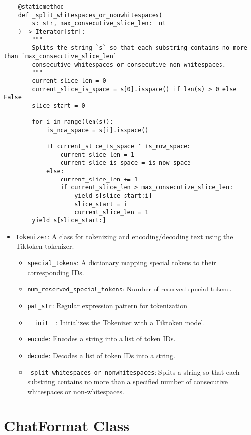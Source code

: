\begin{lstlisting}
    @staticmethod
    def _split_whitespaces_or_nonwhitespaces(
        s: str, max_consecutive_slice_len: int
    ) -> Iterator[str]:
        """
        Splits the string `s` so that each substring contains no more than `max_consecutive_slice_len`
        consecutive whitespaces or consecutive non-whitespaces.
        """
        current_slice_len = 0
        current_slice_is_space = s[0].isspace() if len(s) > 0 else False
        slice_start = 0

        for i in range(len(s)):
            is_now_space = s[i].isspace()

            if current_slice_is_space ^ is_now_space:
                current_slice_len = 1
                current_slice_is_space = is_now_space
            else:
                current_slice_len += 1
                if current_slice_len > max_consecutive_slice_len:
                    yield s[slice_start:i]
                    slice_start = i
                    current_slice_len = 1
        yield s[slice_start:]
\end{lstlisting}

\begin{itemize}
    \item \texttt{Tokenizer}: A class for tokenizing and encoding/decoding text using the Tiktoken tokenizer.
    \begin{itemize}
        \item \texttt{special\_tokens}: A dictionary mapping special tokens to their corresponding IDs.
        \item \texttt{num\_reserved\_special\_tokens}: Number of reserved special tokens.
        \item \texttt{pat\_str}: Regular expression pattern for tokenization.
        \item \texttt{\_\_init\_\_}: Initializes the Tokenizer with a Tiktoken model.
        \item \texttt{encode}: Encodes a string into a list of token IDs.
        \item \texttt{decode}: Decodes a list of token IDs into a string.
        \item \texttt{\_split\_whitespaces\_or\_nonwhitespaces}: Splits a string so that each substring contains no more than a specified number of consecutive whitespaces or non-whitespaces.
    \end{itemize}
\end{itemize}

\section{ChatFormat Class}

